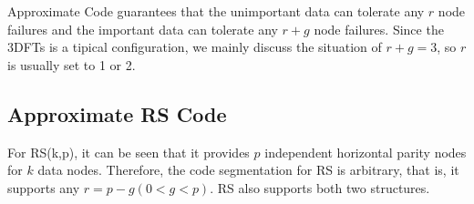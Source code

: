 \documentclass[sigconf]{acmart}
\begin{document}
Approximate Code guarantees that the unimportant data can tolerate any $r$ node failures and the important data can tolerate any $r+g$ node failures.
Since the 3DFTs is a tipical configuration, we mainly discuss the situation of $r+g=3$, so $r$ is usually set to 1 or 2.

\subsection{Approximate RS Code}
For RS(k,p), it can be seen that it provides $p$ independent horizontal parity nodes for $k$ data nodes. Therefore, the code segmentation for RS is arbitrary, that is, it supports any $r=p-g(0<g<p)$. RS also supports both two structures. 
\end{document}
